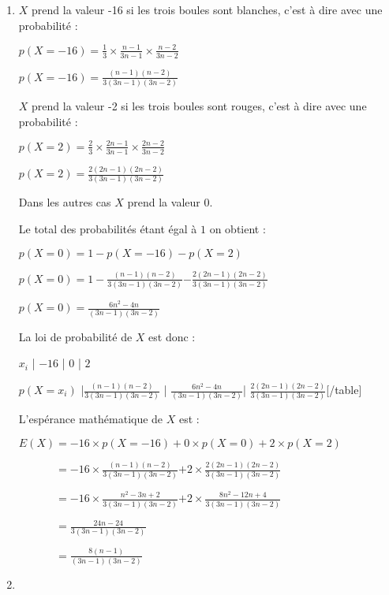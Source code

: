 \begin{corrige}
\begin{enumerate}
          \item
          $X$ prend la valeur -16 si les trois boules sont blanches, c'est à dire avec une probabilité :
          \par
          $p(X=-16)=\frac{1}{3} \times \frac{n-1}{3n-1} \times \frac{n-2}{3n-2} $
          \par
          $p(X=-16)=\frac{(n-1)(n-2)}{3(3n-1)(3n-2)}$
          \par
          $X$ prend la valeur -2 si les trois boules sont rouges, c'est à dire avec une probabilité :
          \par
          $p(X=2)=\frac{2}{3} \times \frac{2n-1}{3n-1} \times \frac{2n-2}{3n-2} $
          \par
          $p(X=2)=\frac{2(2n-1)(2n-2)}{3(3n-1)(3n-2)}$
          \par
          Dans les autres cas $X$ prend la valeur $0$.
          \par
          Le total des probabilités étant égal à $1$ on obtient :
          \par
          $p(X=0)=1-p(X=-16)-p(X=2) $
          \par
          $p(X=0)=1-\frac{(n-1)(n-2)}{3(3n-1)(3n-2)}$$-\frac{2(2n-1)(2n-2)}{3(3n-1)(3n-2)}$
          \par
          $p(X=0)=\frac{6n^2-4n}{(3n-1)(3n-2)}$
          \par
          La loi de probabilité de $X$ est donc :
          \par
          [table class=compact]$x_i$ | $-16$ | $0$ | $2$
          \par
          $p(X=x_i)$ |$\frac{(n-1)(n-2)}{3(3n-1)(3n-2)}$ | $\frac{6n^2-4n}{(3n-1)(3n-2)}$| $\frac{2(2n-1)(2n-2)}{3(3n-1)(3n-2)}$[/table]
          \par
          L'espérance mathématique de $X$ est :
          \par
          $E(X)=-16\times p(X=-16)+0 \times p(X=0)+2 \times p(X=2)$
          \par
          $\phantom{E(X)}=-16\times \frac{(n-1)(n-2)}{3(3n-1)(3n-2)}$$+ 2 \times \frac{2(2n-1)(2n-2)}{3(3n-1)(3n-2)}$
          \par
          $\phantom{E(X)}=-16\times \frac{n^2-3n+2}{3(3n-1)(3n-2)}$$+ 2 \times \frac{8n^2-12n+4}{3(3n-1)(3n-2)}$
          \par
          $\phantom{E(X)}=\frac{24n-24}{3(3n-1)(3n-2)}$
          \par
          $\phantom{E(X)}=\frac{8(n-1)}{(3n-1)(3n-2)}$
          \item
$$
\end{enumerate}
\end{corrige}
